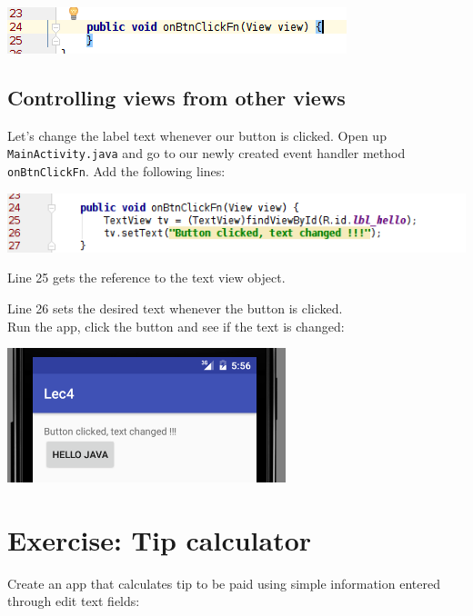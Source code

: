 \begin{center}
	\includegraphics[scale=0.4]{chapters/ch04/images/50}
\end{center}

\subsection{Controlling views from other views}

Let's change the label text whenever our button is clicked. Open up \texttt{MainActivity.java} and go to our newly created event handler method \texttt{onBtnClickFn}. Add the following lines:

\begin{center}
	\includegraphics[scale=0.4]{chapters/ch04/images/51}
\end{center}

Line 25 gets the reference to the text view object. 

Line 26 sets the desired text whenever the button is clicked. \\

Run the app, click the button and see if the text is changed:

\begin{center}
	\includegraphics[scale=0.4]{chapters/ch04/images/52}
\end{center}

\section{Exercise: Tip calculator}

Create an app that calculates tip to be paid using simple information entered through edit text fields:


